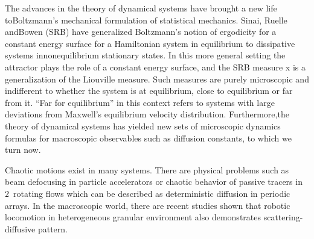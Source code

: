 \documentclass[aps,pre,
                showpacs,
                twocolumn,
                groupedaddress,
                floatfix]{revtex4-1}
\begin{document}
The advances in the theory of dynamical systems have brought a new life toBoltzmann's mechanical formulation of statistical mechanics. Sinai, Ruelle andBowen (SRB) have generalized Boltzmann's notion of ergodicity for a constant energy surface for a Hamiltonian system in equilibrium to dissipative systems in{nonequilibrium} stationary states. In this more general setting the attractor plays the role of a constant energy surface, and the SRB measure x is a generalization of the Liouville measure. Such measures are purely microscopic and indifferent to whether the system is at equilibrium, close to equilibrium or far from it. ``Far for equilibrium'' in this context refers to systems with large deviations from Maxwell's equilibrium velocity distribution. Furthermore,the theory of dynamical systems has yielded new sets of microscopic dynamics formulas for macroscopic observables such as diffusion constants, to which we turn now.

Chaotic motions exist in many systems. There are physical problems such as beam defocusing in particle accelerators  or chaotic behavior of passive tracers in $2$\dmn\ rotating flows which can be described as deterministic diffusion in periodic arrays. In the macroscopic world, there are recent studies shown that robotic locomotion in heterogeneous granular environment also demonstrates scattering-diffusive pattern.

%
%
\end{document}
